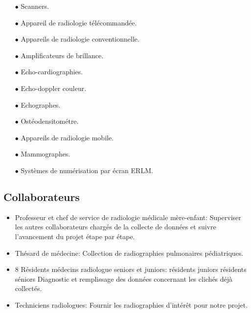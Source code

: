             \vspace{3mm}
            \begin{multicols}{2}
                \begin{itemize}
                    \item[$\bullet$] Scanners.
                    \item[$\bullet$] Appareil de radiologie télécommandée.
                    \item[$\bullet$] Appareils de radiologie conventionnelle.
                    \item[$\bullet$] Amplificateurs de brillance.
                    \item[$\bullet$] Echo-cardiographies.
                    \item[$\bullet$] Echo-doppler couleur.
                    \item[$\bullet$] Echographes.
                    \item[$\bullet$] Ostéodensitométre.
                    \item[$\bullet$] Appareils de radiologie mobile.
                    \item[$\bullet$] Mammographes.
                    \item[$\bullet$] Systèmes de numérisation par écran ERLM.
                \end{itemize} 
            \end{multicols} 
            \vspace{3mm}

        \subsection{Collaborateurs}\label{Collaborateurs}
            \begin{itemize}[label=$\bullet$]
                \item Professeur et chef de service de radiologie médicale mère-enfant:\newline
                Superviser les autres collaborateurs chargés de la collecte de données et suivre l'avancement du projet étape par étape.
                \item Thésard de médecine:\newline
                Collection de radiographies pulmonaires pédiatriques.
                \item 8 Résidents médecins radiologue seniors et juniors: résidents juniors résidents séniors \newline
                Diagnostic et remplissage des données concernant les clichés déjà collectés.
                \item Techniciens radiologues:\newline
                Fournir les radiographies d'intérêt pour notre projet.
            \end{itemize}


